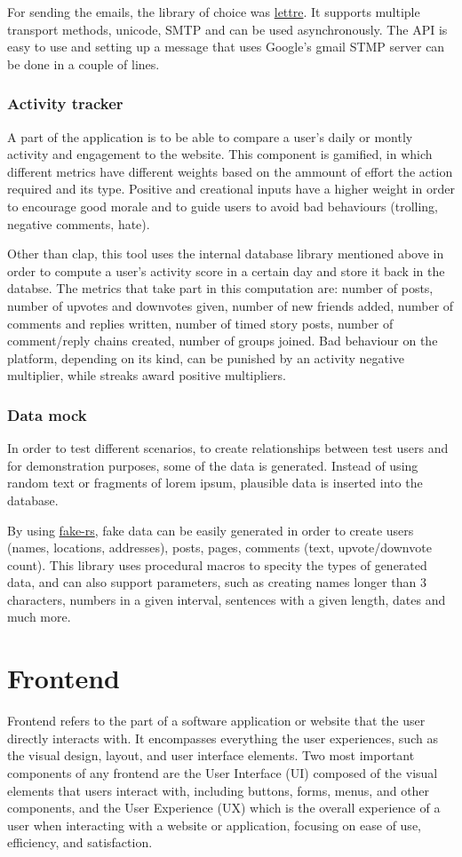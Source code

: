     For sending the emails, the library of choice was \hyperref[lib-lettre]{lettre}. It supports multiple transport methods, unicode, SMTP and can be used asynchronously. The API is easy to use and setting up a message that uses Google's gmail STMP server can be done in a couple of lines.
    
    \subsubsection{Activity tracker}
    A part of the application is to be able to compare a user's daily or montly activity and engagement to the website. This component is gamified, in which different metrics have different weights based on the ammount of effort the action required and its type. Positive and creational inputs have a higher weight in order to encourage good morale and to guide users to avoid bad behaviours (trolling, negative comments, hate).

    Other than clap, this tool uses the internal database library mentioned above in order to compute a user's activity score in a certain day and store it back in the databse. The metrics that take part in this computation are: number of posts, number of upvotes and downvotes given, number of new friends added, number of comments and replies written, number of timed story posts, number of comment/reply chains created, number of groups joined. Bad behaviour on the platform, depending on its kind, can be punished by an activity negative multiplier, while streaks award positive multipliers.
    
    \subsubsection{Data mock}
    In order to test different scenarios, to create relationships between test users and for demonstration purposes, some of the data is generated. Instead of using random text or fragments of lorem ipsum, plausible data is inserted into the database.

    By using \hyperref[lib-fakers]{fake-rs}, fake data can be easily generated in order to create users (names, locations, addresses), posts, pages, comments (text, upvote/downvote count). This library uses procedural macros to specity the types of generated data, and can also support parameters, such as creating names longer than 3 characters, numbers in a given interval, sentences with a given length, dates and much more.

    \section{Frontend}
    Frontend refers to the part of a software application or website that the user directly interacts with. It encompasses everything the user experiences, such as the visual design, layout, and user interface elements. Two most important components of any frontend are the User Interface (UI) composed of the visual elements that users interact with, including buttons, forms, menus, and other components, and the User Experience (UX) which is the overall experience of a user when interacting with a website or application, focusing on ease of use, efficiency, and satisfaction.
